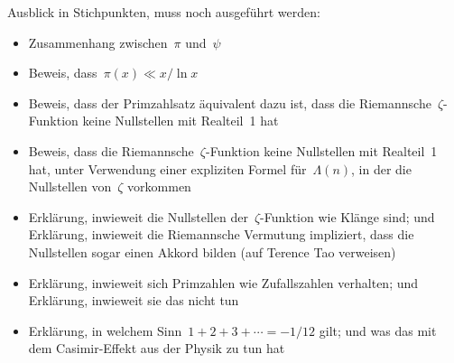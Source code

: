 \documentclass[twoside]{../zirkelblatt1415}
\theoremstyle{definition}
\theoremstyle{plain}
\theoremstyle{remark}
\begin{document}
Ausblick in Stichpunkten, muss noch ausgeführt werden:
\begin{itemize}
\item Zusammenhang zwischen~$\pi$ und~$\psi$
\item Beweis, dass~$\pi(x) \ll x/\ln x$
\item Beweis, dass der Primzahlsatz äquivalent dazu ist, dass die
Riemannsche~$\zeta$-Funktion keine Nullstellen mit Realteil~1 hat
\item Beweis, dass die Riemannsche~$\zeta$-Funktion keine Nullstellen mit
Realteil~1 hat, unter Verwendung einer expliziten Formel für~$\Lambda(n)$, in
der die Nullstellen von~$\zeta$ vorkommen
\item Erklärung, inwieweit die Nullstellen der~$\zeta$-Funktion wie Klänge
sind; und Erklärung, inwieweit die Riemannsche Vermutung impliziert, dass die
Nullstellen sogar einen Akkord bilden (auf Terence Tao verweisen)
\item Erklärung, inwieweit sich Primzahlen wie Zufallszahlen verhalten; und
Erklärung, inwieweit sie das nicht tun
\item Erklärung, in welchem Sinn~$1 + 2 + 3 + \cdots = -1/12$ gilt; und was das mit
dem Casimir-Effekt aus der Physik zu tun hat
\end{itemize}
\end{document}

